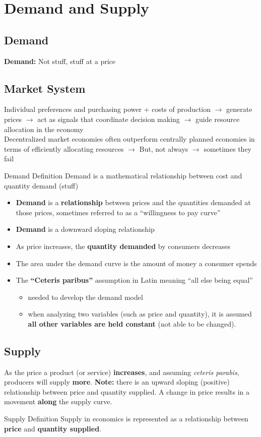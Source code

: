 \section{Demand and Supply}
\subsection{Demand}
\textbf{Demand:} Not stuff, stuff at a price
\subsection{Market System}
Individual preferences and purchasing power + costs of production $\rightarrow$ generate prices $\rightarrow$ act as signals that coordinate decision making $\rightarrow$ guide resource allocation in the economy\\
Decentralized market economies often outperform centrally planned economies in terms of efficiently allocating resources $\rightarrow$ But, not always $\rightarrow$ sometimes they fail
\begin{note}{Demand Definition}
	Demand is a mathematical relationship between cost and quantity demand (stuff)
\end{note}
\begin{itemize}
	\item \textbf{Demand} is a \textbf{relationship} between prices and the quantities demanded at those prices, sometimes referred to as a ``willingness to pay curve''
	\item \textbf{Demand} is a downward sloping relationship
	\item As price increases, the \textbf{quantity demanded} by consumers decreases
	\item The area under the demand curve is the amount of money a consumer spends
	\item The \textbf{``Ceteris paribus''} assumption in Latin meaning ``all else being equal''
	\begin{itemize}
		\item needed to develop the demand model
		\item when analyzing two variables (such as price and quantity), it is assumed \textbf{all other variables are held constant} (not able to be changed).
	\end{itemize}
\end{itemize}

\subsection{Supply}
As the price a product (or service) \textbf{increases}, and assuming \textit{ceteris parabis}, producers will supply \textbf{more}. \textbf{Note:} there is an upward sloping (positive) relationship between price and quantity supplied. A change in price results in a movement \textbf{along} the supply curve.
\begin{note}{Supply Definition}
	Supply in economics is represented as a relationship between \textbf{price} and \textbf{quantity supplied}.
\end{note}
